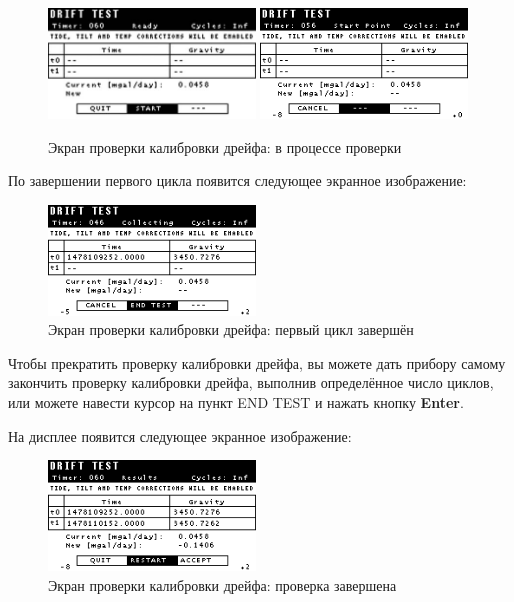 \newpage
\begin{figure}[H]
  \centering
  \includegraphics[width=0.49\textwidth]{figures/the_drift_calibration_test_screen_test_in_progress_1}
  \includegraphics[width=0.49\textwidth]{figures/the_drift_calibration_test_screen_test_in_progress_2}
  \caption{Экран проверки калибровки дрейфа: в процессе проверки}
  \label{fig:the_drift_calibration_test_screen_test_in_progress}
\end{figure}

По завершении первого цикла появится следующее экранное изображение:

\begin{figure}[H]
  \centering
  \includegraphics[width=0.49\textwidth]{figures/the_drift_calibration_test_active_screen_first_cycle_completed}
  \caption{Экран проверки калибровки дрейфа: первый цикл завершён}
  \label{fig:the_drift_calibration_test_active_screen_first_cycle_completed}
\end{figure}

Чтобы прекратить проверку калибровки дрейфа, вы можете дать прибору \cg{} самому
закончить проверку калибровки дрейфа, выполнив определённое число циклов, или
можете навести курсор на пункт END TEST и нажать кнопку \textbf{Enter}.

На дисплее появится следующее экранное изображение:

\begin{figure}[H]
  \centering
  \includegraphics[width=0.49\textwidth]{figures/the_drift_calibration_test_screen_test_completed}
  \caption{Экран проверки калибровки дрейфа: проверка завершена}
  \label{fig:the_drift_calibration_test_screen_test_completed}
\end{figure}

